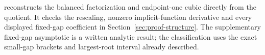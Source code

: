 \documentclass[11pt]{article}
\theoremstyle{remark}
\begin{document}
 reconstructs the balanced
factorization and endpoint-one cubic directly from the quotient. It
checks the rescaling, nonzero implicit-function derivative and every
displayed fixed-gap coefficient in Section~\ref{sec:proof-structure}.
The supplementary fixed-gap asymptotic is a written analytic result;
the classification uses the exact small-gap brackets and largest-root
interval already described.

\clearpage

\clearpage

\end{document}
